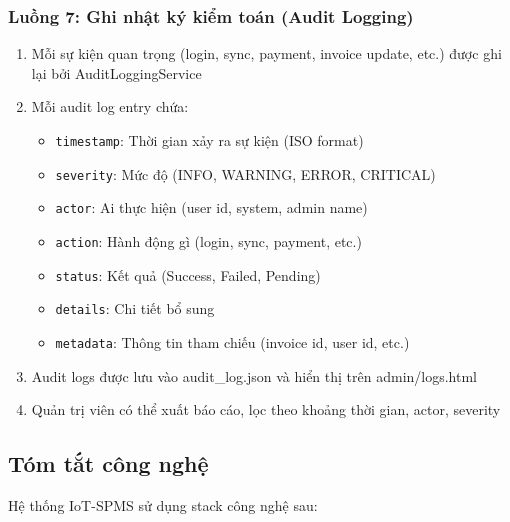 \subsubsection{Luồng 7: Ghi nhật ký kiểm toán (Audit Logging)}

\begin{enumerate}
    \item Mỗi sự kiện quan trọng (login, sync, payment, invoice update, etc.) được ghi lại bởi AuditLoggingService
    \item Mỗi audit log entry chứa:
    \begin{itemize}
        \item \texttt{timestamp}: Thời gian xảy ra sự kiện (ISO format)
        \item \texttt{severity}: Mức độ (INFO, WARNING, ERROR, CRITICAL)
        \item \texttt{actor}: Ai thực hiện (user id, system, admin name)
        \item \texttt{action}: Hành động gì (login, sync, payment, etc.)
        \item \texttt{status}: Kết quả (Success, Failed, Pending)
        \item \texttt{details}: Chi tiết bổ sung
        \item \texttt{metadata}: Thông tin tham chiếu (invoice id, user id, etc.)
    \end{itemize}
    \item Audit logs được lưu vào audit\_log.json và hiển thị trên admin/logs.html
    \item Quản trị viên có thể xuất báo cáo, lọc theo khoảng thời gian, actor, severity
\end{enumerate}

\subsection{Tóm tắt công nghệ}

Hệ thống IoT-SPMS sử dụng stack công nghệ sau:

